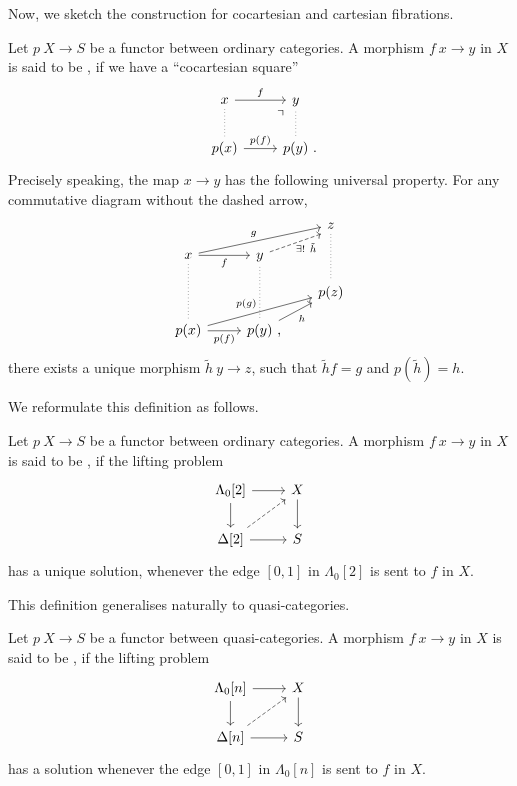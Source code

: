 Now, we sketch the construction for cocartesian and cartesian fibrations.

Let $p\:X\to S$ be a functor between ordinary categories.
A morphism $f\:x\to y$ in $X$ is said to be ,
if we have a ``cocartesian square''
\[\begin{tikzcd}
    x\ar[d,dotted,dash]\ar[r,"f"] & y\ar[d,dotted,dash] \\
    p(x)\ar[r,"p(f)"]\ar[ur,phantom,end anchor=south west,very near end,"\urcorner"] & p(y)\rlap{\ .}
\end{tikzcd}\]
Precisely speaking, the map $x\to y$ has the following universal property.
For any commutative diagram without the dashed arrow,
\[\begin{tikzcd}[row sep=1em]
    && z\ar[dd,dotted,dash] \\
    x\ar[dd,dotted,dash]\ar[r,"f"']\ar[urr,"g"]
    & y\ar[dd,dotted,dash]\ar[ur,dashed,end anchor=south west,"\exists!\ \tilde h"' inner sep=0pt] \\
    && p(z) \\
    p(x)\ar[r,"p(f)"']\ar[urr,"p(g)"]
    & p(y)\rlap{\ ,} \ar[ur,"h"']
\end{tikzcd}\]
there exists a unique morphism $\tilde h\:y\to z$,
such that $\tilde hf=g$ and $p(\tilde h)=h$.

We reformulate this definition as follows.

\begin{definition}
    Let $p\:X\to S$ be a functor between ordinary categories.
    A morphism $f\:x\to y$ in $X$ is said to be ,
    if the lifting problem 
    \[\begin{tikzcd}
        \Lambda_0[2] \ar[d] \ar[r] & X \ar[d] \\
        \Delta[2] \ar[r] \ar[ur,dashed] & S
    \end{tikzcd}\]
    has a unique solution, whenever the edge $[0,1]$ in $\Lambda_0[2]$ is sent to $f$ in $X$.
\end{definition}

This definition generalises naturally to quasi-categories.

\begin{definition}
    Let $p\:X\to S$ be a functor between quasi-categories.
    A morphism $f\:x\to y$ in $X$ is said to be ,
    if the lifting problem 
    \[\begin{tikzcd}
        \Lambda_0[n] \ar[d] \ar[r] & X \ar[d] \\
        \Delta[n] \ar[r] \ar[ur,dashed] & S
    \end{tikzcd}\]
    has a solution whenever the edge $[0,1]$ in $\Lambda_0[n]$ is sent to $f$ in $X$.
\end{definition}


